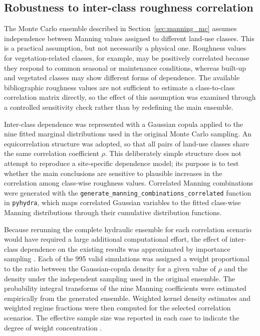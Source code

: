 \documentclass[a4paper,fleqn]{cas-sc}
\begin{document}
\subsection{Robustness to inter-class roughness correlation}\label{sec:correlation_robustness}
The Monte Carlo ensemble described in Section~\ref{sec:manning_mc} assumes independence between Manning values assigned to different land-use classes. This is a practical assumption, but not necessarily a physical one. Roughness values for vegetation-related classes, for example, may be positively correlated because they respond to common seasonal or maintenance conditions, whereas built-up and vegetated classes may show different forms of dependence. The available bibliographic roughness values are not sufficient to estimate a class-to-class correlation matrix directly, so the effect of this assumption was examined through a controlled sensitivity check rather than by redefining the main ensemble.

Inter-class dependence was represented with a Gaussian copula \citep{genest2007,nelsen2006} applied to the nine fitted marginal distributions used in the original Monte Carlo sampling. An equicorrelation structure was adopted, so that all pairs of land-use classes share the same correlation coefficient $\rho$. This deliberately simple structure does not attempt to reproduce a site-specific dependence model; its purpose is to test whether the main conclusions are sensitive to plausible increases in the correlation among class-wise roughness values. Correlated Manning combinations were generated with the \texttt{generate\_manning\_combinations\_correlated} function in \texttt{pyhydra}, which maps correlated Gaussian variables to the fitted class-wise Manning distributions through their cumulative distribution functions.

Because rerunning the complete hydraulic ensemble for each correlation scenario would have required a large additional computational effort, the effect of inter-class dependence on the existing results was approximated by importance sampling \citep{owen2013}. Each of the \num{995} valid simulations was assigned a weight proportional to the ratio between the Gaussian-copula density for a given value of $\rho$ and the density under the independent sampling used in the original ensemble. The probability integral transforms of the nine Manning coefficients were estimated empirically from the generated ensemble. Weighted kernel density estimates and weighted regime fractions were then computed for the selected correlation scenarios. The effective sample size was reported in each case to indicate the degree of weight concentration \citep{kish1965}.
\end{document}
